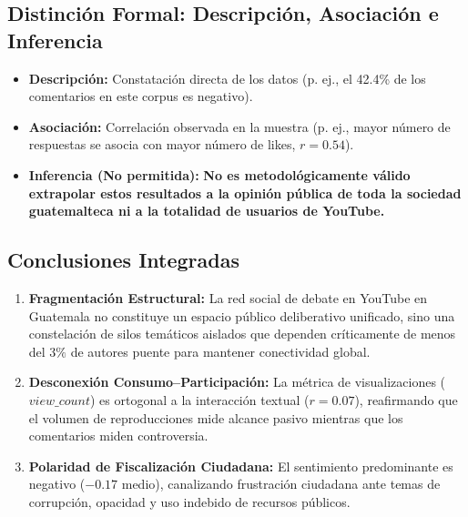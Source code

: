 \documentclass[11pt,a4paper]{article}
\begin{document}
\subsection{Distinción Formal: Descripción, Asociación e Inferencia}
\begin{itemize}
    \item \textbf{Descripción:} Constatación directa de los datos (p. ej., el 42.4\% de los comentarios en este corpus es negativo).
    \item \textbf{Asociación:} Correlación observada en la muestra (p. ej., mayor número de respuestas se asocia con mayor número de likes, $r=0.54$).
    \item \textbf{Inferencia (No permitida):} \textbf{No es metodológicamente válido extrapolar estos resultados a la opinión pública de toda la sociedad guatemalteca ni a la totalidad de usuarios de YouTube.}
\end{itemize}

\subsection{Conclusiones Integradas}
\begin{enumerate}
    \item \textbf{Fragmentación Estructural:} La red social de debate en YouTube en Guatemala no constituye un espacio público deliberativo unificado, sino una constelación de silos temáticos aislados que dependen críticamente de menos del $3\%$ de autores puente para mantener conectividad global.
    \item \textbf{Desconexión Consumo--Participación:} La métrica de visualizaciones ($view\_count$) es ortogonal a la interacción textual ($r=0.07$), reafirmando que el volumen de reproducciones mide alcance pasivo mientras que los comentarios miden controversia.
    \item \textbf{Polaridad de Fiscalización Ciudadana:} El sentimiento predominante es negativo ($-0.17$ medio), canalizando frustración ciudadana ante temas de corrupción, opacidad y uso indebido de recursos públicos.
\end{enumerate}
\end{document}
